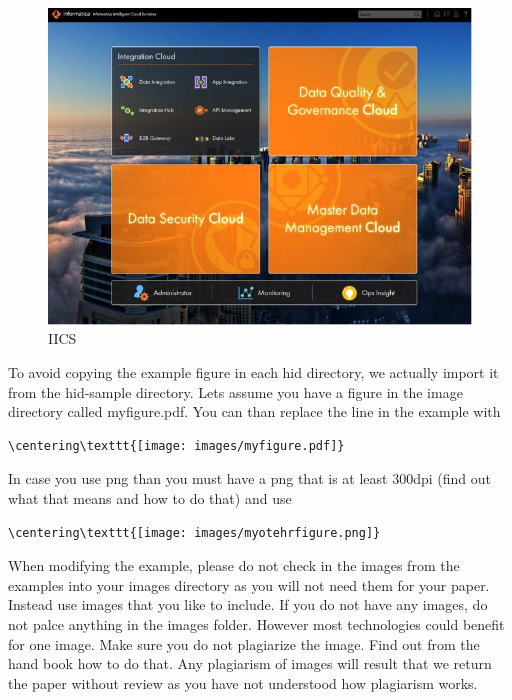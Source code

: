 \begin{figure}[!ht]
  \centering\includegraphics[width=\columnwidth]{images/IICS-0.jpg}
  \caption{IICS}\label{f:fly}
\end{figure}

To avoid copying the example figure in each hid directory, we actually
import it from the hid-sample directory. Lets assume you have a figure
in the image directory called myfigure.pdf. You can than replace the
line in the example with

\begin{verbatim}
\centering\texttt{[image: images/myfigure.pdf]}
\end{verbatim}

In case you use png than you must have a png that is at least 300dpi
(find out what that means and how to do that) and use 

\begin{verbatim}
\centering\texttt{[image: images/myotehrfigure.png]}
\end{verbatim}

When modifying the example, please do not check in the images from the
examples into your images directory as you will not need them for your
paper. Instead use images that you like to include. If you do not have
any images, do not palce anything in the images folder. However most
technologies could benefit for one image. Make sure you do not
plagiarize the image. Find out from the hand book how to do that. Any
plagiarism of images will result that we return the paper without
review as you have not understood how plagiarism works.

